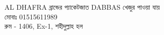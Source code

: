 \documentclass{article}
\begin{document}
\centering
{}
{{\fontsize{73}{87.6} \selectfont {} AL DHAFRA  ব্রান্ডের প্যাকেটজাত  DABBAS  খেজুর পাওয়া যায়\\}{\fontsize{52}{62.4}\selectfont মোবাঃ 01515611989\\  রুম - 1406, Ex-1, শহীদুল্লাহ হল\\}\vspace{1.4cm}}
\end{document}
